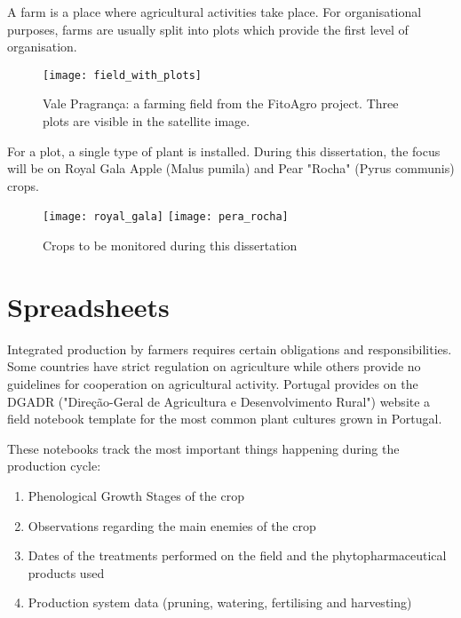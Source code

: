 A farm is a place where agricultural activities take place. For organisational purposes, farms are usually split into plots which provide the first level of organisation.

\begin{figure}[htbp]
  \centering
  \texttt{[image: field\_with\_plots]}
  \caption{Vale Pragrança: a farming field from the FitoAgro project. Three plots are visible in the satellite image.}
  \label{fig:field_with_plots}
\end{figure}

For a plot, a single type of plant is installed. During this dissertation, the focus will be on Royal Gala Apple (Malus pumila) and Pear "Rocha" (Pyrus communis) crops.

\begin{figure}[htbp]
  \centering
    {\texttt{[image: royal\_gala]}}%
  \hfill  
    {\texttt{[image: pera\_rocha]}}%
  \caption{Crops to be monitored during this dissertation}
  \label{fig:crops_studied}
\end{figure}

\section{Spreadsheets} %
\label{sec:problem_spreadsheets}

Integrated production by farmers requires certain obligations and responsibilities. Some countries have strict regulation on agriculture while others provide no guidelines for cooperation on agricultural activity. Portugal provides on the DGADR ("Direção-Geral de Agricultura e Desenvolvimento Rural") website a field notebook template for the most common plant cultures grown in Portugal.

These notebooks track the most important things happening during the production cycle: 

\begin{enumerate}
	\item Phenological Growth Stages of the crop
	\item Observations regarding the main enemies of the crop
	\item Dates of the treatments performed on the field and the phytopharmaceutical products used
	\item Production system data (pruning, watering, fertilising and harvesting)
\end{enumerate}

